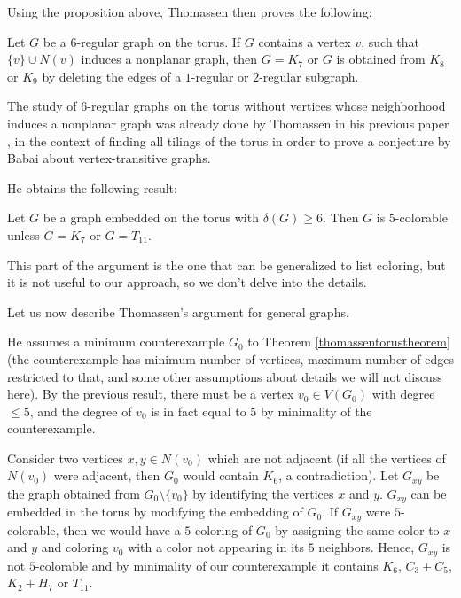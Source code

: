Using the proposition above, Thomassen then proves the following:

\begin{proposition}
Let $G$ be a $6$-regular graph on the torus. If $G$ contains a vertex $v$, such that $\{v\} \cup N(v)$ induces a nonplanar graph, then $G = K_7$ or $G$ is obtained from $K_8$ or $K_9$ by deleting the edges of a $1$-regular or $2$-regular subgraph.
\end{proposition}

The study of $6$-regular graphs on the torus without vertices whose neighborhood induces a nonplanar graph was already done by Thomassen in his previous paper \cite{thomassentilings}, in the context of finding all tilings of the torus in order to prove a conjecture by Babai about vertex-transitive graphs. 

He obtains the following result:

\begin{theorem}
Let $G$ be a graph embedded on the torus with $\delta(G) \geq 6$. Then $G$ is $5$-colorable 
unless $G = K_7$ or $G = T_{11}$.
\end{theorem}

This part of the argument is the one that can be generalized to list coloring, but it is not
useful to our approach, so we don't delve into the details. 

Let us now describe Thomassen's argument for 
general graphs.

He assumes a minimum counterexample $G_0$ to Theorem \ref{thomassentorustheorem} (the counterexample has
minimum number of vertices, maximum number of edges restricted to that, and some other assumptions 
about details we will not discuss here). By the previous result, 
there must be a vertex $v_0 \in V(G_0)$ with degree $\leq 5$, and the degree of $v_0$ is in 
fact equal to $5$ by minimality of the counterexample. 

Consider two vertices $x, y \in N(v_0)$ which are not adjacent (if all the vertices of 
$N(v_0)$ were adjacent, then $G_0$ would contain $K_6$, a contradiction). Let $G_{xy}$ be 
the graph obtained from $G_0 \setminus \{v_0\}$ by identifying the vertices $x$ and $y$. 
$G_{xy}$ can be embedded in the torus by modifying the embedding of $G_0$. If $G_{xy}$ 
were $5$-colorable, then we would have a $5$-coloring of $G_0$ by assigning the same color 
to $x$ and $y$ and coloring $v_0$ with a color not appearing in its $5$ neighbors. 
Hence, $G_{xy}$ is not $5$-colorable and by minimality of our counterexample it 
contains $K_6$, $C_3 + C_5$, $K_2 + H_7$ or $T_{11}$.

